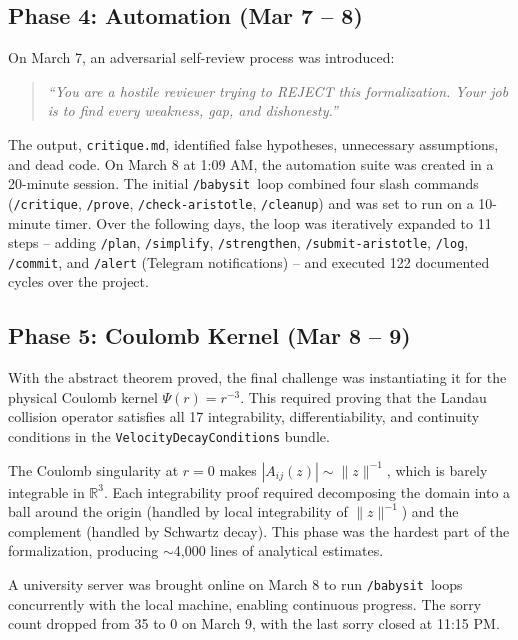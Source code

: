 \documentclass[11pt]{article}
\newcommand{\babysit}{\texttt{/babysit}}
\newcommand{\RR}{\mathbb{R}}
\begin{document}
\subsection{Phase 4: Automation (Mar 7 -- 8)}

On March 7, an adversarial self-review process was introduced:

\begin{quote}
\emph{``You are a hostile reviewer trying to REJECT this formalization. Your job is to find every weakness, gap, and dishonesty.''}
\end{quote}

The output, \texttt{critique.md}, identified false hypotheses, unnecessary assumptions, and dead code. On March 8 at 1:09 AM, the automation suite was created in a 20-minute session. The initial \babysit\ loop combined four slash commands (\texttt{/critique}, \texttt{/prove}, \texttt{/check-aristotle}, \texttt{/cleanup}) and was set to run on a 10-minute timer. Over the following days, the loop was iteratively expanded to 11 steps -- adding \texttt{/plan}, \texttt{/simplify}, \texttt{/strengthen}, \texttt{/submit-aristotle}, \texttt{/log}, \texttt{/commit}, and \texttt{/alert} (Telegram notifications) -- and executed 122 documented cycles over the project.

\subsection{Phase 5: Coulomb Kernel (Mar 8 -- 9)}

With the abstract theorem proved, the final challenge was instantiating it for the physical Coulomb kernel $\Psi(r) = r^{-3}$. This required proving that the Landau collision operator satisfies all 17 integrability, differentiability, and continuity conditions in the \texttt{VelocityDecayConditions} bundle.

The Coulomb singularity at $r = 0$ makes $|A_{ij}(z)| \sim \|z\|^{-1}$, which is barely integrable in $\RR^3$. Each integrability proof required decomposing the domain into a ball around the origin (handled by local integrability of $\|z\|^{-1}$) and the complement (handled by Schwartz decay). This phase was the hardest part of the formalization, producing $\sim$4{,}000 lines of analytical estimates.

A university server was brought online on March 8 to run \babysit\ loops concurrently with the local machine, enabling continuous progress. The sorry count dropped from 35 to 0 on March 9, with the last sorry closed at 11:15 PM.
\end{document}

